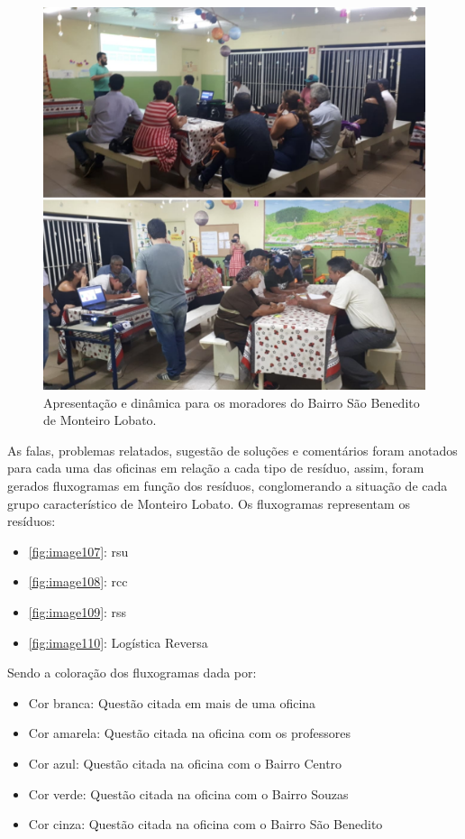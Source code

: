 \begin{figure}
\centering
\includegraphics[width=0.75\linewidth]{produtos/prodtres/image106}
\caption{Apresentação e dinâmica para os moradores do Bairro São Benedito de Monteiro Lobato.}
\label{fig:image106}
\end{figure}


As falas, problemas relatados, sugestão de soluções e comentários foram anotados para cada uma das oficinas em relação a cada tipo de resíduo, assim, foram gerados fluxogramas em função dos resíduos, conglomerando a situação de cada grupo característico de Monteiro Lobato. Os fluxogramas representam os resíduos:
\begin{itemize}
	\item \autoref{fig:image107}: \gls{rsu}
	\item \autoref{fig:image108}: \gls{rcc}
	\item \autoref{fig:image109}: \gls{rss}
	\item \autoref{fig:image110}: Logística Reversa 
\end{itemize}

Sendo a coloração dos fluxogramas dada por:

\begin{itemize}
	\item Cor branca: Questão citada em mais de uma oficina
	\item Cor amarela: Questão citada na oficina com os professores
	\item Cor azul: Questão citada na oficina com o Bairro Centro
	\item Cor verde: Questão citada na oficina com o Bairro Souzas
	\item Cor cinza: Questão citada na oficina com o Bairro São Benedito
\end{itemize}

